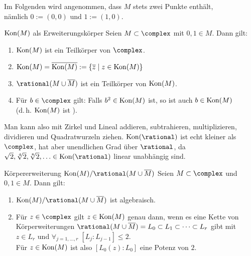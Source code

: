 \linie
\pagebreak

\begin{Bem}
    Im Folgenden wird angenommen, dass $M$ stets zwei Punkte enthält,\\
    nämlich $0 := (0, 0)$ und $1 := (1, 0)$.
\end{Bem}

\begin{Theorem}{$\operatorname{Kon}(M)$ als Erweiterungskörper}
    Seien $M \subset \complex$ mit $0, 1 \in M$. Dann gilt:
    \begin{enumerate}[label=(\alph*)]
        \item
        $\operatorname{Kon}(M)$ ist ein Teilkörper von $\complex$.
        
        \item
        $\operatorname{Kon}(M) = \overline{\operatorname{Kon}(M)} := \{\overline{z} \;|\; z \in \operatorname{Kon}(M)\}$
        
        \item
        $\rational(M \cup \overline{M})$ ist ein Teilkörper von $\operatorname{Kon}(M)$.
        
        \item
        Für $b \in \complex$ gilt:
        Falls $b^2 \in \operatorname{Kon}(M)$ ist, so ist auch $b \in \operatorname{Kon}(M)$\\
        (d.\,h. $\operatorname{Kon}(M)$ ist ).
    \end{enumerate}
\end{Theorem}

\begin{Bem}
    Man kann also mit Zirkel und Lineal addieren, subtrahieren, multiplizieren,
    dividieren und Quadratwurzeln ziehen.
    $\Kon(\rational)$ ist echt kleiner als $\complex$, hat
    aber unendlichen Grad über $\rational$,
    da $\sqrt{2}, \sqrt[4]{2}, \sqrt[8]{2}, \dotsc \in \Kon(\rational)$
    linear unabhängig sind.
\end{Bem}

\linie

\begin{Theorem}{Körpererweiterung $\Kon(M)/\rational(M \cup \overline{M})$}
    Seien $M \subset \complex$ und $0, 1 \in M$. Dann gilt:
    \begin{enumerate}[label=(\alph*)]
        \item
        $\Kon(M)/\rational(M \cup \overline{M})$ ist algebraisch.
        
        \item
        Für $z \in \complex$ gilt $z \in \operatorname{Kon}(M)$ genau dann, wenn
        es eine Kette von Körperweiterungen
        $\rational(M \cup \overline{M}) = L_0 \subset L_1 \subset \dotsb
        \subset L_r$ gibt mit $z \in L_r$ und
        $\forall_{j=1,\dotsc,r}\; [L_j:L_{j-1}] \le 2$.\\
        Für $z \in \operatorname{Kon}(M)$ ist also
        $[L_0(z):L_0]$ eine Potenz von $2$.
    \end{enumerate}
\end{Theorem}

